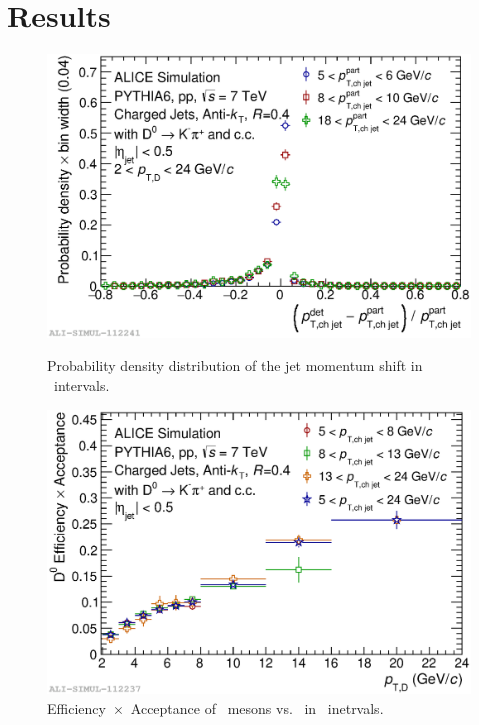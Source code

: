 \documentclass[a4paper]{jpconf}
\begin{document}
\section{Results}
\label{sect:detperf}
\begin{figure}[tb]
\centering
\begin{minipage}{.48\textwidth}
\includegraphics[width=\textwidth]{img/HQ16_Simulation_DetectorResponse}
\caption{\label{fig:HQ16_Simulation_DetectorResponse} Probability density distribution of the jet momentum shift in \ptchjet\ intervals.}
\end{minipage}\hspace{1pc}%
\begin{minipage}{.48\textwidth}
\includegraphics[width=\textwidth]{img/HQ16_Simulation_EfficiencyVsDPt}
\caption{\label{fig:HQ16_Simulation_EfficiencyVsDPt}Efficiency~$\times$~Acceptance of \Dzero\ mesons vs. \ptd\ in \ptchjet\ inetrvals.}
\end{minipage} 
\end{figure}
\end{document}
